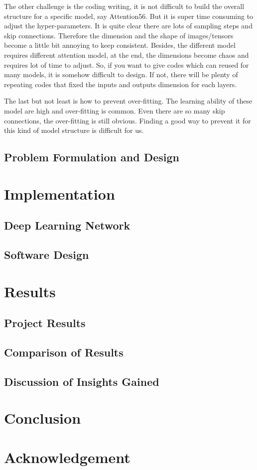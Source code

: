 \documentclass{article}
\begin{document}
\begin{multicols}{2}
The other challenge is the coding writing, it is not difficult to build the overall structure for a specific model, say Attention56. But it is super time consuming to adjust the hyper-parameters. It is quite clear there are lots of sampling steps and skip connections. Therefore the dimension and the shape of images/tensors become a little bit annoying to keep consistent. Besides, the different model requires different attention model, at the end, the dimensions become chaos and requires lot of time to adjust. So, if you want to give codes which can reused for many models, it is somehow difficult to design. If not, there will be plenty of repeating codes that fixed the inputs and outputs dimension for each layers. 

The last but not least is how to prevent over-fitting. The learning ability of these model are high and over-fitting is common. Even there are so many skip connections, the over-fitting is still obvious. Finding a good way to prevent it for this kind of model structure is difficult for us. 

\subsection{Problem Formulation and Design}

\section{Implementation}
\subsection{Deep Learning Network}
\subsection{Software Design}

\section{Results}
\subsection{Project Results}
\subsection{Comparison of Results}
\subsection{Discussion of Insights Gained}

\section{Conclusion}
\section{Acknowledgement}

\end{multicols}

\newpage



\end{document}
